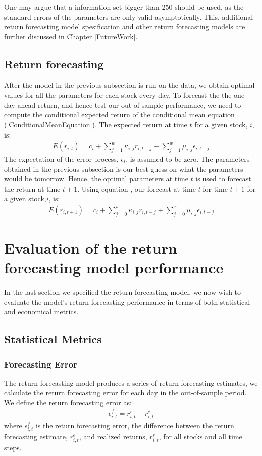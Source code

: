 One may argue that a information set bigger than 250 should be used, as the standard errors of the parameters are only valid asymptotically. This, additional return forecasting model spesification and other return forecasting models are further discussed in Chapter \ref{FutureWork}.


\subsection{Return forecasting}

After the model in the previous subsection is run on the data, we obtain optimal values for all the parameters for each stock every day. To forecast the the one-day-ahead return, and hence test our out-of sample performance, we need to compute the conditional expected return of the conditional mean equation (\ref{ConditionalMeanEquation}). The expected return at time $t$ for a given stock, $i$, is:
\begin{align} 
    E(r_{i,t})=c_i+\sum_{j=1}^w\kappa_{i,j} r_{i,t-j}+\sum_{j=1}^w\mu_{i,j} \epsilon_{i,t-j} \label{ExpectedConditionalMean}
\end{align}
The expectation of the error process, $\epsilon_t$, is assumed to be zero. The parameters obtained in the previous subsection is our best guess on what the parameters would be tomorrow. Hence, the optimal parameters at time $t$ is used to forecast the return at time $t+1$. Using equation \label{ExpectedConditionalMean}, our forecast at time $t$ for time $t+1$ for a given stock,$i$, is:
\begin{align} 
    E(r_{i,t+1})=c_i+\sum_{j=0}^w\kappa_{i,j} r_{i,t-j}+\sum_{j=0}^x\mu_{i,j} \epsilon_{i,t-j}
\end{align}

\section{Evaluation of the return forecasting model performance}
In the last section we specified the return forecasting model, we now wish to evaluate the model's return forecasting performance in terms of both statistical and economical metrics. 

\subsection{Statistical Metrics}

\subsubsection{Forecasting Error}
The return forecasting model produces a series of return forecasting estimates, we calculate the return forecasting error for each day in the out-of-sample period. We define the return forecasting error as:
\begin{align}
    \epsilon_{i,t}^{f} = r_{i,t}^{r} - r_{i,t}^{e}
\end{align}
where $\epsilon_{i,t}^{f}$ is the return forecasting error, the difference between the return forecasting estimate, $r_{i,t}^{e}$, and realized returns, $r_{i,t}^{r}$, for all stocks and all time steps.

